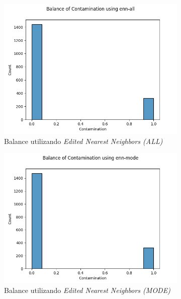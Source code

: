 \begin{figure}[!ht]
\begin{subfigure}[b]{0.3\textwidth}
        \includegraphics[width=\textwidth]{media/images/under-sampling/enn-all.png}
        \caption{Balance utilizando \textit{Edited Nearest Neighbors (ALL)}}
    \end{subfigure}
    \begin{subfigure}[b]{0.3\textwidth}
        \centering
        \includegraphics[width=\textwidth]{media/images/under-sampling/enn-mode.png}
        \caption{Balance utilizando \textit{Edited Nearest Neighbors (MODE)}}
    \end{subfigure}
    \begin{subfigure}[b]{0.3\textwidth}
        \centering

\end{subfigure}
\end{figure}

